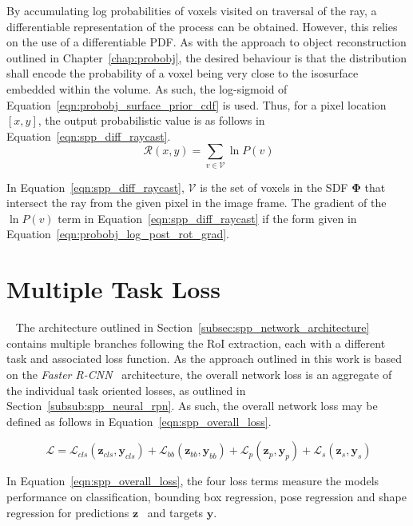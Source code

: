 By accumulating log probabilities of voxels visited on traversal of the ray, a differentiable representation 
of the process can be obtained. However, this relies on the use of a differentiable PDF\@. As with the approach 
to object reconstruction outlined in Chapter~\ref{chap:probobj}, the desired behaviour is that the distribution 
shall encode the probability of a voxel being very close to the isosurface embedded within the volume. As such, 
the log-sigmoid of Equation~\ref{eqn:probobj_surface_prior_cdf} is used. Thus, for a pixel location \( [x, y] \), 
the output probabilistic value is as follows in Equation~\ref{eqn:spp_diff_raycast}.
\begin{equation}
~\label{eqn:spp_diff_raycast}
\mathcal{R}(x, y) = \sum_{v \in \mathcal{V}} \ln P(v)
\end{equation}

In Equation~\ref{eqn:spp_diff_raycast}, \( \mathcal{V} \) is the set of voxels in the SDF \( \bm{\Phi} \) that 
intersect the ray from the given pixel in the image frame. The gradient of the \( \ln P(v) \) term in 
Equation~\ref{eqn:spp_diff_raycast} if the form given in Equation~\ref{eqn:probobj_log_post_rot_grad}.

\section{Multiple Task Loss}
~\label{sec:spp_loss}
The architecture outlined in Section~\ref{subsec:spp_network_architecture} contains multiple branches 
following the RoI extraction, each with a different task and associated loss function. As the approach outlined 
in this work is based on the \textit{Faster R-CNN}~\cite{Ren2015RCNN} architecture, the overall network loss 
is an aggregate of the individual task oriented losses, as outlined in Section~\ref{subsub:spp_neural_rpn}. 
As such, the overall network loss may be defined as follows in Equation~\ref{eqn:spp_overall_loss}.

\begin{equation}
  ~\label{eqn:spp_overall_loss}
  \mathcal{L} = 
  \mathcal{L}_{cls}(\bm{z}_{cls}, \bm{y}_{cls}) + 
  \mathcal{L}_{bb}(\bm{z}_{bb}, \bm{y}_{bb}) + 
  \mathcal{L}_{p}(\bm{z}_{p}, \bm{y}_{p}) + 
  \mathcal{L}_{s}(\bm{z}_{s}, \bm{y}_{s})
\end{equation}

In Equation~\ref{eqn:spp_overall_loss}, the four loss terms measure the models performance on 
classification, bounding box regression, pose regression and shape regression for predictions \( \bm{z} \) \
and targets \( \bm{y} \).

